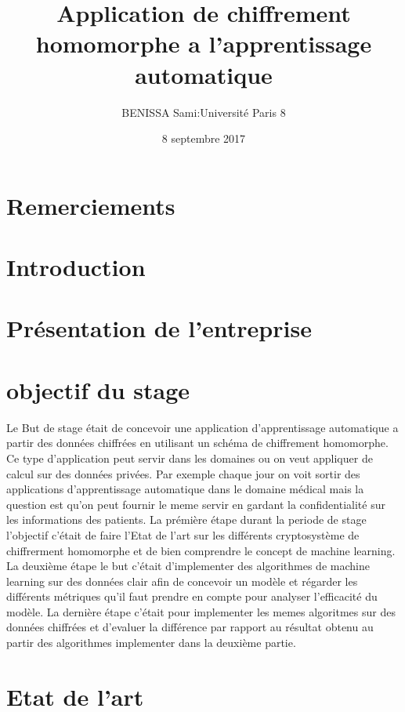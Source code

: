 \documentclass[a4paper,11pt]{report}
\title{Application de chiffrement homomorphe a l'apprentissage automatique}
\author{BENISSA Sami\quad:\quad Université Paris 8}
\date{8 septembre 2017}
\begin{document}
\maketitle
\section{Remerciements}
\newpage
\section{Introduction}
\newpage
\section{Présentation de l’entreprise}
\newpage
\newpage

\section{objectif du stage}
Le But de  stage était de concevoir une application d'apprentissage automatique a partir des données chiffrées en utilisant un schéma de chiffrement homomorphe.\newline
Ce type d'application peut servir dans les domaines ou on veut appliquer de calcul sur des données privées.\newline
Par exemple chaque jour on voit sortir des applications d'apprentissage automatique dans le domaine médical mais la question est qu'on peut fournir le meme servir en gardant la confidentialité sur les informations des patients.\newline
La prémière étape durant la periode de stage l'objectif c'était de faire l'Etat de l'art sur les différents cryptosystème de chiffrerment homomorphe et de bien comprendre le concept de machine learning.\newline
La deuxième étape le but c'était d'implementer des algorithmes de machine learning sur des données clair afin de concevoir un modèle et régarder les différents métriques qu'il faut prendre en compte pour analyser l'efficacité du modèle.\newline
La dernière étape c'était pour implementer les memes algoritmes sur des données chiffrées et d'evaluer la différence par rapport au résultat obtenu au partir des algorithmes implementer dans la deuxième partie.\newline
\section{Etat de l'art} 
\end{document}
